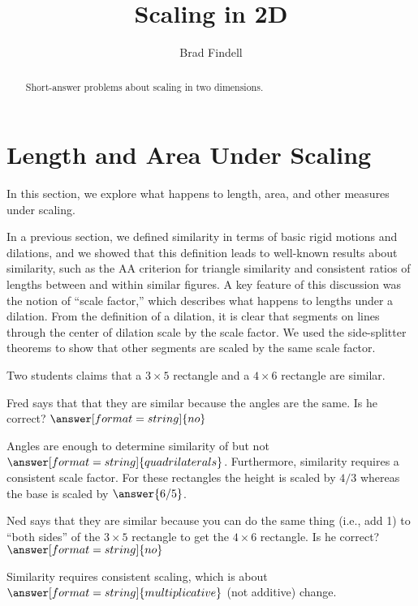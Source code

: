 \documentclass[nooutcomes]{ximera}
\title{Scaling in 2D}
\author{Brad Findell}
\begin{document}
\begin{abstract}
Short-answer problems about scaling in two dimensions.
\end{abstract}
\maketitle




\section{Length and Area Under Scaling}
In this section, we explore what happens to length, area, and other measures under scaling.  
 
In a previous section, we defined similarity in terms of basic rigid motions and dilations, and we showed that this definition leads to well-known results about similarity, such as the AA criterion for triangle similarity and consistent ratios of lengths between and within similar figures. A key feature of this discussion was the notion of ``scale factor,'' which describes what happens to lengths under a dilation.  From the definition of a dilation, it is clear that segments on lines through the center of dilation scale by the scale factor.  We used the side-splitter theorems to show that other segments are scaled by the same scale factor.  

\begin{question}
Two students claims that a $3\times 5$ rectangle and a $4\times 6$ rectangle are similar.  

Fred says that that they are similar because the angles are the same.  Is he correct? 
$\answer[format=string]{no}$

\begin{question}
Angles are enough to determine similarity of 
but not $\answer[format=string]{quadrilaterals}$.  
Furthermore, similarity requires a consistent scale factor.  For these rectangles the height is scaled by $4/3$ whereas the base is scaled by $\answer{6/5}$.  

\begin{question}
Ned says that they are similar because you can do the same thing (i.e., add 1) to ``both sides'' of the $3\times 5$ rectangle to get the $4\times 6$ rectangle.  Is he correct? 
$\answer[format=string]{no}$

\begin{question}
Similarity requires consistent scaling, which is about $\answer[format=string]{multiplicative}$ (not additive) change.  
\end{question}
\end{question}
\end{question}
\end{question}
\end{document}
